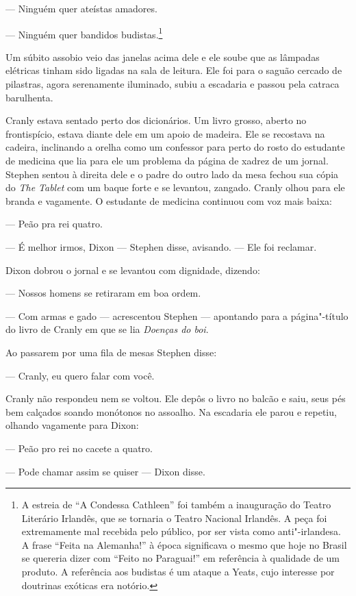  --- Ninguém quer ateístas amadores.

 --- Ninguém quer bandidos budistas.\footnote{ A estreia de “A Condessa
Cathleen” foi também a inauguração do Teatro Literário Irlandês, que se
tornaria o Teatro Nacional Irlandês. A peça foi extremamente mal
recebida pelo público, por ser vista como anti"-irlandesa. A frase
“Feita na Alemanha!” à época significava o mesmo que hoje no Brasil se
quereria dizer com “Feito no Paraguai!” em referência à qualidade de um
produto. A referência aos budistas é um ataque a Yeats, cujo interesse
por doutrinas exóticas era notório.}

Um súbito assobio veio das janelas acima dele e ele soube que as
lâmpadas elétricas tinham sido ligadas na sala de leitura. Ele foi para
o saguão cercado de pilastras, agora serenamente iluminado, subiu a
escadaria e passou pela catraca barulhenta.

Cranly estava sentado perto dos dicionários. Um livro grosso, aberto no
frontispício, estava diante dele em um apoio de madeira. Ele se
recostava na cadeira, inclinando a orelha como um confessor para perto
do rosto do estudante de medicina que lia para ele um problema da
página de xadrez de um jornal. Stephen sentou à direita dele e o padre
do outro lado da mesa fechou sua cópia do \textit{The Tablet} com um
baque forte e se levantou, zangado. Cranly olhou para ele branda e
vagamente. O estudante de medicina continuou com voz mais baixa:

 --- Peão pra rei quatro.

 --- É melhor irmos, Dixon --- Stephen disse, avisando. --- Ele foi reclamar.

Dixon dobrou o jornal e se levantou com dignidade, dizendo:

 --- Nossos homens se retiraram em boa ordem.

 --- Com armas e gado --- acrescentou Stephen --- apontando para a página"-título
do livro de Cranly em que se lia \textit{Doenças do boi}.

Ao passarem por uma fila de mesas Stephen disse:

 --- Cranly, eu quero falar com você.

Cranly não respondeu nem se voltou. Ele depôs o livro no balcão e
saiu, seus pés bem calçados soando monótonos no assoalho. Na escadaria
ele parou e repetiu, olhando vagamente para Dixon:

 --- Peão pro rei no cacete a quatro.

 --- Pode chamar assim se quiser --- Dixon disse.

